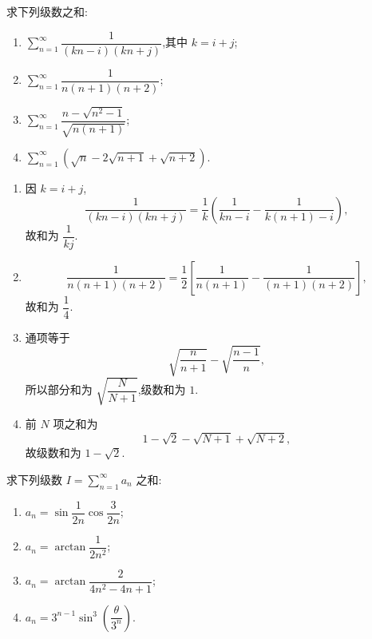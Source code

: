 \begin{example}
    求下列级数之和:
    \begin{enumerate}
        \item $\displaystyle\sum\limits_{n=1}^{\infty}\dfrac{1}{(kn-i)(kn+j)}$,其中 $k=i+j$;
        \item $\displaystyle\sum\limits_{n=1}^{\infty}\dfrac{1}{n(n+1)(n+2)}$;
        \item $\displaystyle\sum\limits_{n=1}^{\infty}\dfrac{n-\sqrt{n^2-1}}{\sqrt{n(n+1)}}$;
        \item $\displaystyle\sum\limits_{n=1}^{\infty}(\sqrt{n}-2\sqrt{n+1}+\sqrt{n+2})$.
    \end{enumerate}
\end{example}
\exampleblank

\begin{solution}
    \leavevmode
    \begin{enumerate}
        \item 因 $k=i+j$,
              \[
                  \dfrac{1}{(kn-i)(kn+j)}
                  =\dfrac{1}{k}\left(\dfrac{1}{kn-i}-\dfrac{1}{k(n+1)-i}\right),
              \]
              故和为 $\boxed{\dfrac{1}{kj}}$.
        \item
              \[
                  \dfrac{1}{n(n+1)(n+2)}
                  =\dfrac{1}{2}\left[\dfrac{1}{n(n+1)}-\dfrac{1}{(n+1)(n+2)}\right],
              \]
              故和为 $\boxed{\dfrac{1}{4}}$.
        \item 通项等于
              \[
                  \sqrt{\dfrac{n}{n+1}}-\sqrt{\dfrac{n-1}{n}},
              \]
              所以部分和为 $\sqrt{\dfrac{N}{N+1}}$,级数和为 $\boxed1$.
        \item 前 $N$ 项之和为
              \[
                  1-\sqrt2-\sqrt{N+1}+\sqrt{N+2},
              \]
              故级数和为 $\boxed{1-\sqrt2}$.
    \end{enumerate}
\end{solution}

\begin{example}
    求下列级数 $\displaystyle I=\sum\limits_{n=1}^{\infty}a_n$ 之和:
    \begin{enumerate}
        \item $\displaystyle a_n=\sin\dfrac{1}{2n}\cos\dfrac{3}{2n}$;
        \item $\displaystyle a_n=\arctan\dfrac{1}{2n^2}$;
        \item $\displaystyle a_n=\arctan\dfrac{2}{4n^2-4n+1}$;
        \item $\displaystyle a_n=3^{n-1}\sin^3\left(\dfrac{\theta}{3^n}\right)$.
    \end{enumerate}
\end{example}
\exampleblank

